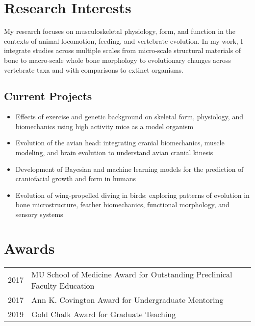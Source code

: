 \documentclass[11pt, a4paper]{awesome-cv}
\providecommand{\tightlist}{%
	\setlength{\itemsep}{0pt}\setlength{\parskip}{0pt}}
\begin{document}
\hypertarget{research-interests}{%
\section{Research Interests}\label{research-interests}}

My research focuses on musculoskeletal physiology, form, and function in
the contexts of animal locomotion, feeding, and vertebrate evolution. In
my work, I integrate studies across multiple scales from micro-scale
structural materials of bone to macro-scale whole bone morphology to
evolutionary changes across vertebrate taxa and with comparisons to
extinct organisms.

\hypertarget{current-projects}{%
\subsection{Current Projects}\label{current-projects}}

\begin{itemize}
\tightlist
\item
  Effects of exercise and genetic background on skeletal form,
  physiology, and biomechanics using high activity mice as a model
  organism
\item
  Evolution of the avian head: integrating cranial biomechanics, muscle
  modeling, and brain evolution to understand avian cranial kinesis
\item
  Development of Bayesian and machine learning models for the prediction
  of craniofacial growth and form in humans
\item
  Evolution of wing-propelled diving in birds: exploring patterns of
  evolution in bone microstructure, feather biomechanics, functional
  morphology, and sensory systems
\end{itemize}

\hypertarget{awards}{%
\section{Awards}\label{awards}}

\begin{tabular}{rl}
  2017 & MU School of Medicine Award for Outstanding Preclinical Faculty Education \\ 
  2017 & Ann K. Covington Award for Undergraduate Mentoring \\ 
  2019 & Gold Chalk Award for Graduate Teaching \\ 
  \end{tabular}
\end{document}
